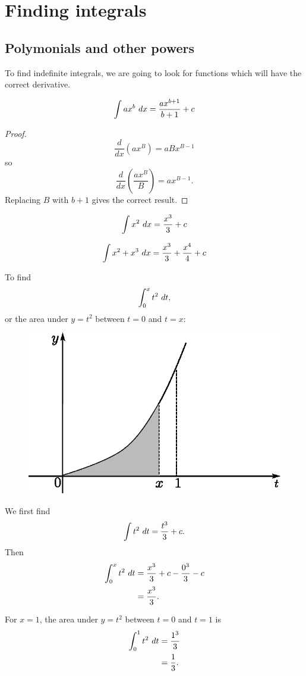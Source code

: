 \section{Finding integrals}

\subsection{Polymonials and other powers}
To find indefinite integrals, we are going to look for functions which will have the correct derivative.

\begin{in_a_box}
\[\int ax^b\dx=\frac{ax^{b+1}}{b+1}+c\]
\begin{proof}
\[\frac{d}{dx}\left(ax^B\right) = aBx^{B-1}\]
so
\[\frac{d}{dx}\left(\frac{ax^B}{B}\right) = ax^{B-1}.\]
Replacing $B$ with $b+1$ gives the correct result.
\end{proof}
\end{in_a_box}

\begin{example}
$$\int x^2\dx = \frac{x^3}{3}+c$$
\end{example}
\begin{example}
$$\int x^2+x^3\dx = \frac{x^3}{3}+\frac{x^4}{4}+c$$
\end{example}
\begin{example}
To find
$$\int_0^x t^2\dx[t],$$
or the area under $y=t^2$ between $t=0$ and $t=x$:
\begin{figure}[H]
\centering
\includegraphics[scale=0.8]{img/integration-graph-t-squared}
\end{figure}

We first find
$$\int t^2\dx[t] = \frac{t^3}{3}+c.$$
Then
\begin{align*}\int_0^x t^2\dx[t] &= \frac{x^3}{3}+c-\frac{0^3}{3}-c\\&=\frac{x^3}{3}.\end{align*}

For $x=1$, the area under $y=t^2$ between $t=0$ and $t=1$ is
\begin{align*}\int_0^1 t^2\dx[t] &=\frac{1^3}{3}\\&=\frac{1}{3}.\end{align*}

\end{example}

